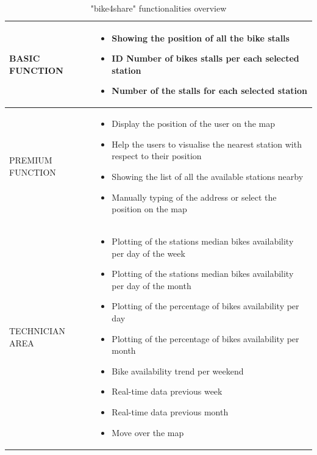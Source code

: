 \documentclass{article}
\begin{document}
\begin{table} [H]
    \begin{center}
        \begin{tabular}{|l|p{}|}
            \hline
            BASIC FUNCTION &   \begin{itemize}
                               \item Showing the position of all the bike stalls
                               \item ID Number of bikes stalls per each selected station
                               \item Number of the stalls for each selected station
                               \end{itemize}
        \\
            \hline
            PREMIUM FUNCTION &  \begin{itemize}
                                \item Display the position of the user on the map
                                \item Help the users to visualise the nearest station with respect to their position
                                \item Showing the list of all the available  stations nearby
                                \item Manually typing of the address or select the position on the map  
                                \end{itemize}
             \\
            \hline
            TECHNICIAN AREA &  \begin{itemize}
                               \item Plotting of the stations median bikes availability per day of the week
                               \item Plotting of the stations median bikes availability per day of the month
                               \item Plotting of the percentage of bikes availability per day
                               \item Plotting of the percentage of bikes availability per month
                               \item Bike availability trend per weekend
                               \item Real-time data previous week
                               \item Real-time data previous month
                               \item Move over the map
                               \end{itemize}
                \\
            \hline
        \end{tabular}
    \end{center}
\caption{"bike4share" functionalities overview}
\end{table}
\end{document}
